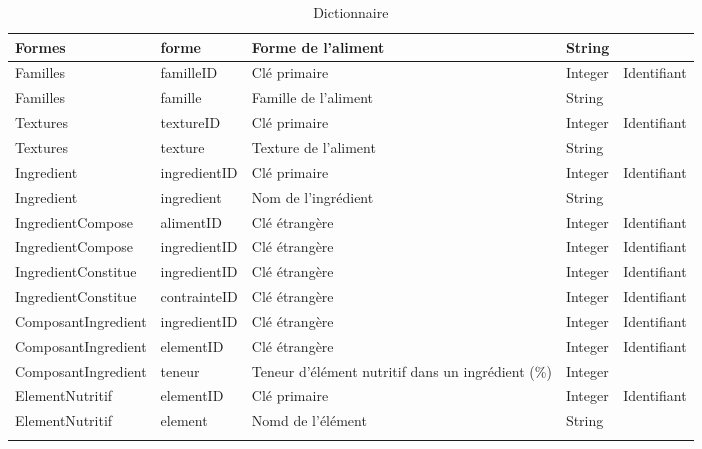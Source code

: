 \begin{longtable}{llp{5cm}ll}
  Formes & forme & Forme de l'aliment & String & \\ \hline
  Familles & familleID & Clé primaire & Integer & Identifiant \\
  Familles & famille & Famille de l'aliment & String & \\ \hline
  Textures & textureID & Clé primaire & Integer & Identifiant \\
  Textures & texture & Texture de l'aliment & String & \\ \hline
  Ingredient & ingredientID & Clé primaire & Integer & Identifiant \\
  Ingredient & ingredient & Nom de l'ingrédient & String &  \\ \hline
  IngredientCompose & alimentID & Clé étrangère & Integer & Identifiant \\
  IngredientCompose & ingredientID & Clé étrangère & Integer & Identifiant \\ \hline
  IngredientConstitue & ingredientID & Clé étrangère & Integer & Identifiant \\
  IngredientConstitue & contrainteID & Clé étrangère & Integer & Identifiant \\ \hline
  ComposantIngredient & ingredientID & Clé étrangère & Integer & Identifiant \\
  ComposantIngredient & elementID & Clé étrangère & Integer & Identifiant \\
  ComposantIngredient & teneur & Teneur d'élément nutritif dans un ingrédient (\%) & Integer & \\ \hline
  ElementNutritif & elementID & Clé primaire & Integer & Identifiant \\
  ElementNutritif & element & Nomd de l'élément & String &  \\ \hline
\caption{Dictionnaire}
\label{DictionnaireMDD}
\end{longtable}

